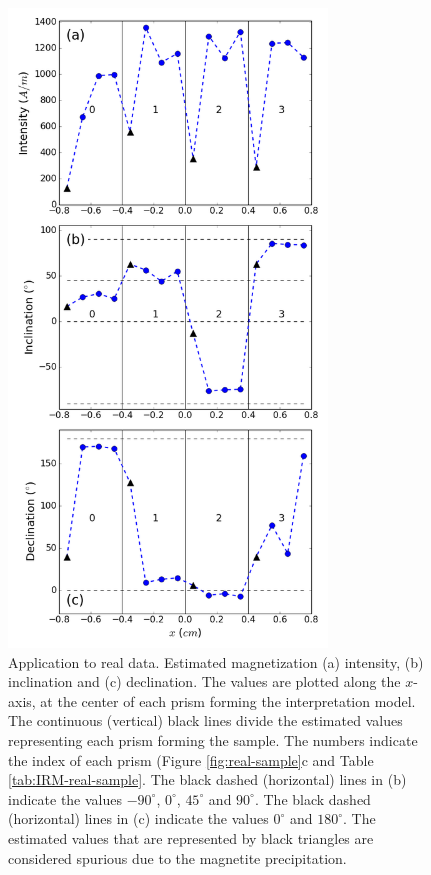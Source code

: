 \documentclass[galley,gc]{agutex}
\begin{document}
 \begin{figure}
 \noindent \includegraphics[width=20pc]{Figs/Fig15_LQ.png}
 \caption{Application to real data. Estimated magnetization 
 (a) intensity, (b) inclination and (c) declination.
 The values are plotted along the $x$-axis, at the center of each 
 prism forming the interpretation model.
 The continuous (vertical) black lines divide the estimated values 
 representing each prism forming the sample.
 The numbers indicate the index of each prism 
 (Figure \ref{fig:real-sample}c and Table \ref{tab:IRM-real-sample}.
 The black dashed (horizontal) lines in (b) indicate the values 
 $-90^{\circ}$, $0^{\circ}$, $45^{\circ}$ and $90^{\circ}$.
 The black dashed (horizontal) lines in (c) indicate the values 
 $0^{\circ}$ and $180^{\circ}$.
 The estimated values that are represented by black triangles are
 considered spurious due to the magnetite precipitation.}
 \label{fig:estimate-real}
 \end{figure}
\end{document}
